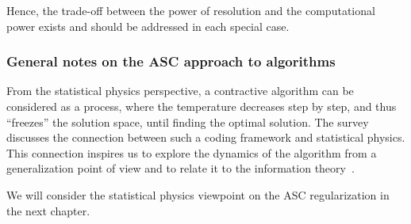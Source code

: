 Hence, the trade-off between the power of resolution and the computational 
power exists and should be addressed in each special case.

\subsubsection{General notes on the ASC approach to algorithms}

From the statistical physics perspective, a contractive algorithm can be
considered as a process, where the temperature decreases step by step, and thus
``freezes'' the solution space, until finding the optimal solution. The
survey~\citep[Sec.~3.2]{Merhav:2010} discusses the connection between such a
coding framework and statistical physics. This connection \citep{JB:ISIT:2010}
inspires us to explore the dynamics of the algorithm from a generalization point
of view and to relate it to the information theory~\citep{Merhav:2010}.

We will consider the statistical physics viewpoint on the ASC regularization in the next
chapter.